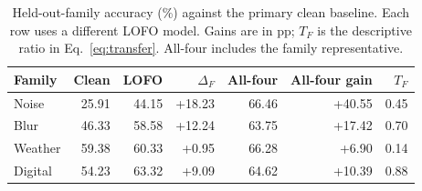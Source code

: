 \begin{table}[!htbp]
\caption{Held-out-family accuracy (\%) against the primary clean baseline. Each row uses a different LOFO model. Gains are in pp; $T_F$ is the descriptive ratio in Eq.~\ref{eq:transfer}. All-four includes the family representative.}
\label{tab:transfer}
\centering
\setlength{\tabcolsep}{5pt}
\begin{tabular}{lrrrrrr}
\toprule
Family & Clean & LOFO & $\Delta_F$ & All-four & All-four gain & $T_F$ \\
\midrule
Noise & 25.91 & 44.15 & +18.23 & 66.46 & +40.55 & 0.45 \\
Blur & 46.33 & 58.58 & +12.24 & 63.75 & +17.42 & 0.70 \\
Weather & 59.38 & 60.33 & +0.95 & 66.28 & +6.90 & 0.14 \\
Digital & 54.23 & 63.32 & +9.09 & 64.62 & +10.39 & 0.88 \\
\bottomrule
\end{tabular}
\end{table}

